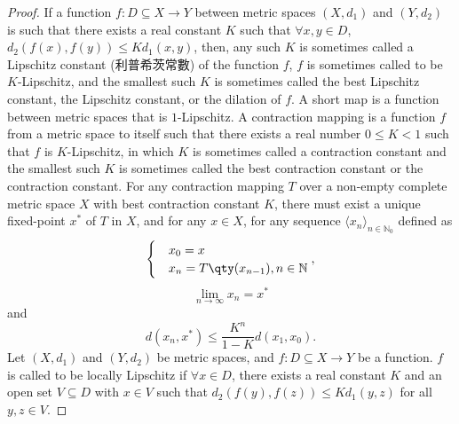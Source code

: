 \documentclass[a4paper,12pt]{report}
\begin{document}
\begin{itemize}
\begin{itemize}
\begin{proof}
If a function $f\colon D\subseteq X\to Y$ between metric spaces $(X,d_1)$ and $(Y,d_2)$ is such that there exists a real constant $K$ such that $\forall x,y\in D$, $d_{2}(f(x),f(y))\leq Kd_{1}(x,y)$, then, any such $K$ is sometimes called a Lipschitz constant (利普希茨常數) of the function $f$, $f$ is sometimes called to be $K$-Lipschitz, and the smallest such $K$ is sometimes called the best Lipschitz constant, the Lipschitz constant, or the dilation of $f$.
A short map is a function between metric spaces that is $1$-Lipschitz.
A contraction mapping is a function $f$ from a metric space to itself such that there exists a real number $0\leq K<1$ such that $f$ is $K$-Lipschitz, in which $K$ is sometimes called a contraction constant and the smallest such $K$ is sometimes called the best contraction constant or the contraction constant.
For any contraction mapping $T$ over a non-empty complete metric space $X$ with best contraction constant $K$, there must exist a unique fixed-point $x^*$ of $T$ in $X$, and for any $x\in X$, for any sequence $\langle x_n\rangle_{n\in \mathbb {N}_0}$ defined as
\[\begin{cases}
&x_0=x\\
&x_n=T\qty(x_{n-1}),n\in\mathbb{N}
\end{cases},\]
\[\lim_{n\to \infty }x_{n}=x^{*}\]
and
\[d(x_n,x^*)\leq\frac{K^n}{1-K}d(x_1,x_0).\]
Let $(X,d_1)$ and $(Y,d_2)$ be metric spaces, and $f\colon D\subseteq X\to Y$ be a function. $f$ is called to be locally Lipschitz if $\forall x\in D$, there exists a real constant $K$ and an open set $V\subseteq D$ with $x\in V$ such that $d_{2}(f(y),f(z))\leq Kd_{1}(y,z)$ for all $y,z\in V$.


\end{proof}
\end{itemize}
\end{itemize}
\end{document}
